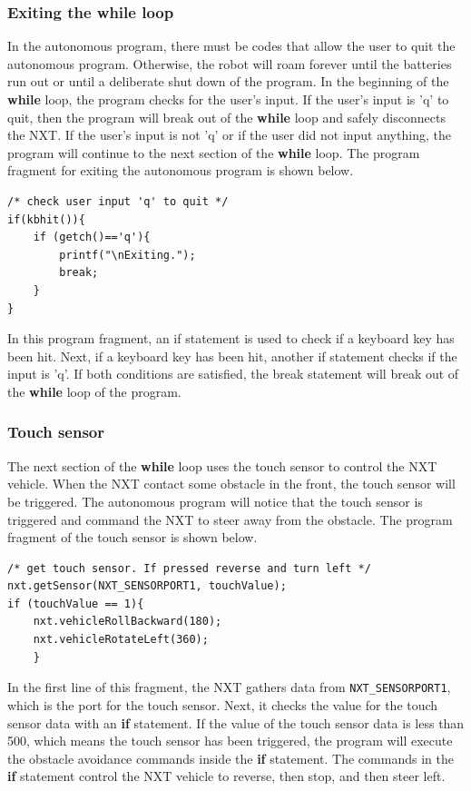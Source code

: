 \documentclass[11pt]{article}
\begin{document}
\subsubsection*{Exiting the while loop}
In the autonomous program, there must be codes that allow the user to quit the autonomous program.
Otherwise, the robot will roam forever until the batteries run out or until a deliberate shut down of the program.
In the beginning of the {\bf while} loop, the program checks for the user's input. 
If the user's input is 'q' to quit, then the program will break out of the {\bf while} loop and safely disconnects the NXT.
If the user's input is not 'q' or if the user did not input anything, the program will continue to the next section of
the {\bf while} loop. The program fragment for exiting the autonomous program is shown below.
\begin{lstlisting}
/* check user input 'q' to quit */
if(kbhit()){
    if (getch()=='q'){	
        printf("\nExiting.");
        break;
    }
}
\end{lstlisting}
In this program fragment, an if statement is used to check if a keyboard key has been hit.
Next, if a keyboard key has been hit, another if statement checks if the input is 'q'.
If both conditions are satisfied, the break statement will break out of the {\bf while} 
loop of the program.

\subsubsection*{Touch sensor}
The next section of the {\bf while} loop uses the touch sensor to control the NXT vehicle.
When the NXT contact some obstacle in the front, the touch sensor will be triggered.
The autonomous program will notice that the touch sensor is triggered and command the 
NXT to steer away from the obstacle. The program fragment of the touch sensor is shown 
below.
\begin{lstlisting}
/* get touch sensor. If pressed reverse and turn left */
nxt.getSensor(NXT_SENSORPORT1, touchValue);
if (touchValue == 1){
    nxt.vehicleRollBackward(180);
    nxt.vehicleRotateLeft(360);
    }
\end{lstlisting}
In the first line of this fragment, the NXT gathers data from {\tt NXT\_SENSORPORT1}, 
which is the port for the touch sensor. Next, it checks the value for the touch 
sensor data with an {\bf if} statement. If the value of the touch sensor data is less 
than 500, which means the touch sensor has been triggered, the program will execute 
the obstacle avoidance commands inside the {\bf if} statement. The commands in the 
{\bf if} statement control the NXT vehicle to reverse, then stop, and then steer left.
\end{document}
